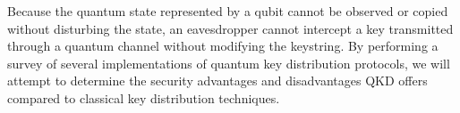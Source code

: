 \documentclass[conference]{IEEEtran}
\begin{document}
\begin{enumerate}
Because the quantum state represented by a qubit cannot be observed or copied without disturbing the state, an eavesdropper cannot intercept a key transmitted through a quantum channel without modifying the keystring. By performing a survey of several implementations of quantum key distribution protocols, we will attempt to determine the security advantages and disadvantages QKD offers compared to classical key distribution techniques.\\



%
%
%


\end{enumerate}
\end{document}
